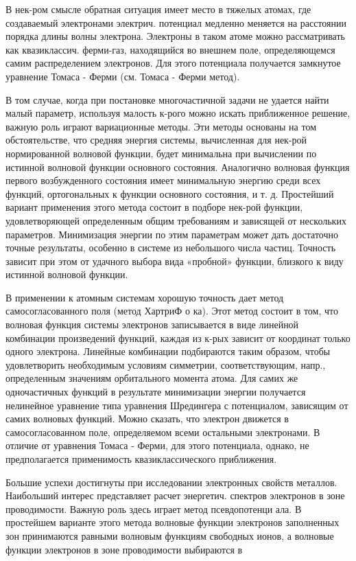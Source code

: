 \documentclass[10pt]{article}
\begin{document}
В нек-ром смысле обратная ситуация имеет место в тяжелых атомах, где создаваемый электронами электрич. потенциал медленно меняется на расстоянии порядка длины волны электрона. Электроны в таком атоме можно рассматривать как квазиклассич. ферми-газ, находящийся во внешнем поле, определяющемся самим распределением электронов. Для этого потенциала получается замкнутое уравнение Томаса - Ферми (см. Томаса - Ферми метод).



В том случае, когда при постановке многочастичной задачи не удается найти малый параметр, используя малость к-рого можно искать приближенное решение, важную роль играют вариационные методы. Эти методы основаны на том обстоятельстве, что средняя энергия системы, вычисленная для нек-рой нормированной волновой функции, будет минимальна при вычислении по истинной волновой функции основного состояния. Аналогично волновая функция первого возбужденного состояния имеет минимальную энергию среди всех функций, ортогональных к функции основного состояния, и т. д. Простейший вариант применения этого метода состоит в подборе нек-рой функции, удовлетворяющей определенным общим требованиям и зависящей от нескольких параметров. Минимизация энергии по этим параметрам может дать достаточно точные результаты, особенно в системе из небольшого числа частиц. Точность зависит при этом от удачного выбора вида «пробной» функции, близкого к виду истинной волновой функции.



В применении к атомным системам хорошую точность дает метод самосогласованного поля (метод ХартриФ о ка). Этот метод состоит в том, что волновая функция системы электронов записывается в виде линейной комбинации произведений функций, каждая из к-рых зависит от координат только одного электрона. Линейные комбинации подбираются таким образом, чтобы удовлетворить необходимым условиям симметрии, соответствующим, напр., определенным значениям орбитального момента атома. Для самих же одночастичных функций в результате минимизации энергии получается нелинейное уравнение типа уравнения Шредингера с потенциалом, зависящим от самих волновых функций. Можно сказать, что электрон движется в самосогласованном поле, определяемом всеми остальными электронами. В отличие от уравнения Томаса - Ферми, для этого потенциала, однако, не предполагается применимость квазиклассического приближения.



Большие успехи достигнуты при исследовании электронных свойств металлов. Наибольший интерес представляет расчет энергетич. спектров электронов в зоне проводимости. Важную роль здесь играет метод псевдопотенци ала. В простейшем варианте этого метода волновые функции электронов заполненных зон принимаются равными волновым функциям свободных ионов, а волновые функции электронов в зоне проводимости выбираются в
\end{document}
